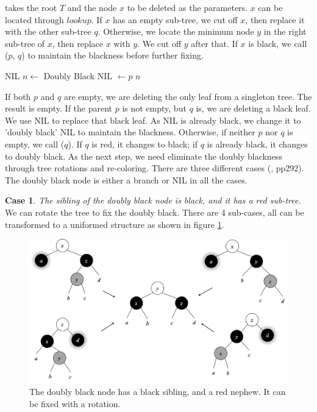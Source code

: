\documentclass[b5paper]{article}
\begin{document}
 takes the root $T$ and the node $x$ to be deleted as the parameters. $x$ can be located through $lookup$. If $x$ has an empty sub-tree, we cut off $x$, then replace it with the other sub-tree $q$. Otherwise, we locate the minimum node $y$ in the right sub-tree of $x$, then replace $x$ with $y$. We cut off $y$ after that. If $x$ is black, we call ($p$, $q$) to maintain the blackness before further fixing.

\begin{algorithmic}[1]
    \State \Return NIL 
    \State $n \gets$ Doubly Black NIL
    \State {} $\gets p$
    \State \Return $n$
  \Else
    \State \Return {}
  \EndIf
\EndFunction
\end{algorithmic}

If both $p$ and $q$ are empty, we are deleting the only leaf from a singleton tree. The result is empty. If the parent $p$ is not empty, but $q$ is, we are deleting a black leaf. We use NIL to replace that black leaf. As NIL is already black, we change it to 'doubly black' NIL to maintain the blackness. Otherwise, if neither $p$ nor $q$ is empty, we call ($q$). If $q$ is red, it changes to black; if $q$ is already black, it changes to doubly black. As the next step, we need eliminate the doubly blackness through tree rotations and re-coloring. There are three different cases (\cite{CLRS}, pp292). The doubly black node is either a branch or NIL in all the cases.

\textbf{Case 1}. {\em The sibling of the doubly black node is black, and it has a red sub-tree.} We can rotate the tree to fix the doubly black. There are 4 sub-cases, all can be transformed to a uniformed structure as shown in figure \ref{fig:del-case1}.

\begin{figure}[htbp]
   \centering
   \includegraphics[scale=0.4]{../../../datastruct/tree/red-black-tree/img/del-case1.png}
   \caption{The doubly black node has a black sibling, and a red nephew. It can be fixed with a rotation.}
   \label{fig:del-case1}
\end{figure}
\end{document}
